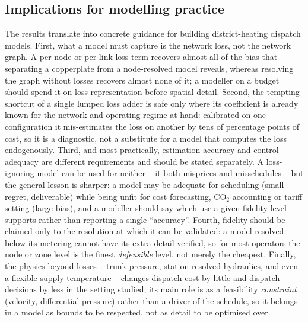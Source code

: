 \documentclass[a4paper,fleqn]{cas-dc}
\begin{document}
\subsection{Implications for modelling practice}
The results translate into concrete guidance for building district-heating dispatch models.
First, what a model must capture is the network loss, not the network graph. A per-node or
per-link loss term recovers almost all of the bias that separating a copperplate from a
node-resolved model reveals, whereas resolving the graph without losses recovers almost none
of it; a modeller on a budget should spend it on loss representation before spatial detail.
Second, the tempting shortcut of a single lumped loss adder is safe only where its coefficient
is already known for the network and operating regime at hand: calibrated on one configuration
it mis-estimates the loss on another by tens of percentage points of cost, so it is a
diagnostic, not a substitute for a model that computes the loss endogenously. Third, and most
practically, estimation accuracy and control adequacy are different requirements and should be
stated separately. A loss-ignoring model can be used for neither -- it both misprices and
misschedules -- but the general lesson is sharper: a model may be adequate for scheduling
(small regret, deliverable) while being unfit for cost forecasting, CO$_2$ accounting or tariff
setting (large bias), and a modeller should say which use a given fidelity level supports rather
than reporting a single ``accuracy''. Fourth, fidelity should be claimed only to the resolution
at which it can be validated: a model resolved below its metering cannot have its extra detail
verified, so for most operators the node or zone level is the finest \emph{defensible} level,
not merely the cheapest. Finally, the physics beyond losses -- trunk pressure, station-resolved
hydraulics, and even a flexible supply temperature -- changes dispatch cost by little and
dispatch decisions by less in the setting studied; its main role is as a feasibility
\emph{constraint} (velocity, differential pressure) rather than a driver of the schedule, so it
belongs in a model as bounds to be respected, not as detail to be optimised over.

\end{document}
